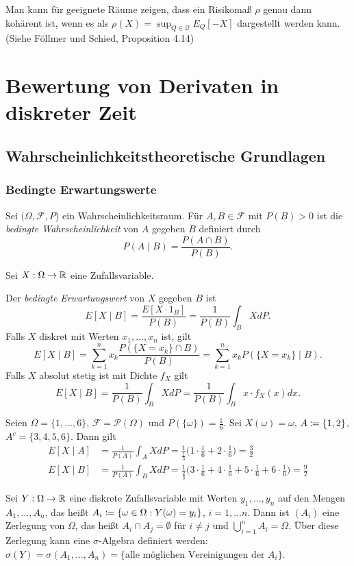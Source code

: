 \documentclass[a4paper,twoside,DIV15,BCOR12mm]{scrbook}
\newcommand{\cF}{\mathcal F}
\begin{document}
Man kann für geeignete Räume zeigen, dass ein Risikomaß $\rho$ genau dann kohärent ist, wenn es als $\rho(X) = \sup_{Q\in\mathcal Q}E_Q[-X]$ dargestellt werden kann. (Siehe Föllmer und Schied, Proposition 4.14)

\chapter{Bewertung von Derivaten in diskreter Zeit}
\section{Wahrscheinlichkeitstheoretische Grundlagen}
\subsection{Bedingte Erwartungswerte}

Sei $(\Omega, \cF, P$) ein Wahrscheinlichkeitsraum. Für $A,B\in\cF$ mit $P(B)>0$ ist die \emph{bedingte Wahrscheinlichkeit} von $A$ gegeben $B$ definiert durch
\[
P(A\mid B) = \frac{P(A\cap B)}{P(B)}.
\]

Sei $X:\Omega \to \mathbb{R}$ eine Zufallsvariable.
\begin{definition}
Der \emph{bedingte Erwartungswert} von $X$ gegeben $B$ ist
\[
E[X\mid B] = \frac{E[X \cdot 1_B]}{P(B)} = \frac{1}{P(B)} \int_B X dP.
\] 
Falls $X$ diskret mit Werten $x_1,\ldots,x_n$ ist, gilt
\[
E[X\mid B] = \sum_{k=1}^n x_k \frac{P(\{X=x_k\}\cap B)}{P(B)}
= \sum_{k=1}^{n} x_k P(\{X=x_k\}\mid B).
\]
Falls $X$ absolut stetig ist mit Dichte $f_X$ gilt 
\[
E[X\mid B] = \frac{1}{P(B)} \int_B XdP
=\frac{1}{P(B)} \int_B x\cdot f_X(x) dx.
\]
\end{definition}

\begin{beispiel}[Würfel]
Seien $\Omega = \{1,\ldots,6\}$, $\cF = \mathcal P(\Omega)$ und $P(\{\omega\})=\frac 16$. Sei $X(\omega)=\omega$, $A\da \{1,2\}$, $A^c = \{3,4,5,6\}$. Dann gilt 
\begin{align*}
E[X\mid A] &= \frac1{P(A)} \int_A XdP = \frac1{\frac13} \big(1\cdot \frac 16 + 2\cdot\frac16\big) = \frac 32 \\
E[X\mid B] &= \frac1{P(A)} \int_B XdP = \frac1{\frac23} \big(3\cdot \frac 16 + 4\cdot\frac16 + 5\cdot\frac16 + 6\cdot\frac16\big) = \frac 92
\end{align*}
\end{beispiel}

Sei $Y:\Omega\to\mathbb{R}$ eine diskrete Zufallsvariable mit Werten $y_1,\ldots,y_n$ auf den Mengen $A_1,\ldots,A_n$, das heißt $A_i \da \{\omega\in\Omega: Y(\omega) = y_i\}$, $i=1,\ldots n$. Dann ist $(A_i)$ eine Zerlegung von $\Omega$, das heißt $A_i\cap A_j= \emptyset$ für $i\ne j$ und $\bigcup_{i=1}^n A_i=\Omega$. Über diese Zerlegung kann eine $\sigma$-Algebra definiert werden: $\sigma(Y)=\sigma(A_1,\ldots,A_n)=\{\text{alle möglichen Vereinigungen der $A_i$}\}$.
\end{document}
